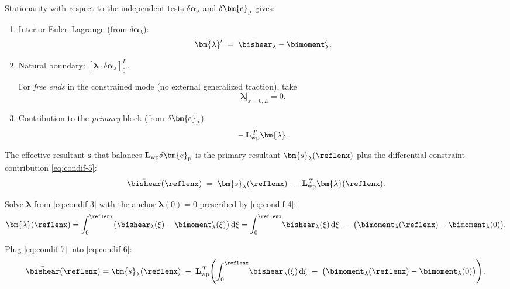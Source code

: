 Stationarity with respect to the independent tests \(\delta\bm{\alpha}_{\lambda}\) and \(\delta \bm{e}_{\rm p}\) gives:
\begin{enumerate}
  \item Interior Euler–Lagrange (from \(\delta\bm{\alpha}_{\lambda}\)):
  \begin{equation}
    \bm{\lambda}' \;=\; \bishear_{\lambda} - \bimoment_{\lambda}'.
    \label{eq:condif-3}
  \end{equation}
  \item Natural boundary: \([\bm{\lambda}\cdot\delta\bm{\alpha}_{\lambda}]_{0}^{L}\).
  
  For \emph{free ends} in the constrained mode (no external generalized traction), take
  \begin{equation}
    \bm{\lambda}|_{x=0,L}=0 .
    \label{eq:condif-4}
  \end{equation}
  \item Contribution to the \emph{primary} block (from \(\delta \bm{e}_{\rm p}\)):
  \begin{equation}
    -\,\mathbf{L}_{\rm wp}^{\,T}\bm{\lambda}.
    \label{eq:condif-5}
  \end{equation}
\end{enumerate}

The effective resultant \(\bar{\bm{s}}\) that balances \(\mathbf{L}_{\rm wp}\delta\bm{e}_{\rm p}\) is the primary resultant 
\(\bm{s}_{\lambda}(\reflenx)\) plus the differential constraint contribution \eqref{eq:condif-5}:
\begin{equation}
\bar{\bishear}(\reflenx) \;=\; \bm{s}_{\lambda}(\reflenx)
\;-\;\mathbf{L}_{\rm wp}^{\,T}\bm{\lambda}(\reflenx).
  \label{eq:condif-6}
\end{equation}

Solve \(\bm{\lambda}\) from \eqref{eq:condif-3} with the anchor \(\bm{\lambda}(0)=0\) prescribed by \eqref{eq:condif-4}:
\begin{equation}
  \bm{\lambda}(\reflenx)
  = \int_{0}^{\reflenx}\!\big(\bishear_{\lambda}(\xi) - \bimoment_{\lambda}'(\xi)\big)\,\mathrm{d}\xi
  = \int_{0}^{\reflenx}\!\bishear_{\lambda}(\xi)\,\mathrm{d}\xi 
  \;-\;\big(\bimoment_{\lambda}(\reflenx)-\bimoment_{\lambda}(0)\big).
  \label{eq:condif-7}
\end{equation}

Plug \eqref{eq:condif-7} into \eqref{eq:condif-6}:
\begin{equation}
  \bar{\bishear}(\reflenx)
  = \bm{s}_{\lambda}(\reflenx)\;-\;\mathbf{L}_{\rm wp}^{\,T}\!\left(\int_{0}^{\reflenx}\!\bishear_{\lambda}(\xi)\,\mathrm d\xi\;-\;\big(\bimoment_{\lambda}(\reflenx)-\bimoment_{\lambda}(0)\big)\right).
  \label{eq:condif-8}
\end{equation}

